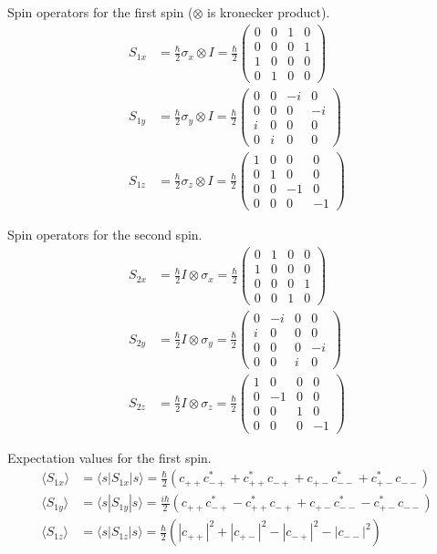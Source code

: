 Spin operators for the first spin
($\otimes$ is kronecker product).
\begin{align*}
S_{1x}&=\frac{\hbar}{2}\sigma_x\otimes I=\frac{\hbar}{2}
\begin{pmatrix}
0&0&1&0\\
0&0&0&1\\
1&0&0&0\\
0&1&0&0
\end{pmatrix}
\\
S_{1y}&=\frac{\hbar}{2}\sigma_y\otimes I=\frac{\hbar}{2}
\begin{pmatrix}
0&0&-i&0\\
0&0&0&-i\\
i&0&0&0\\
0&i&0&0
\end{pmatrix}
\\
S_{1z}&=\frac{\hbar}{2}\sigma_z\otimes I=\frac{\hbar}{2}
\begin{pmatrix}
1&0&0&0\\
0&1&0&0\\
0&0&-1&0\\
0&0&0&-1
\end{pmatrix}
\end{align*}

Spin operators for the second spin.
\begin{align*}
S_{2x}&=\frac{\hbar}{2}I\otimes\sigma_x=\frac{\hbar}{2}
\begin{pmatrix}
0&1&0&0\\
1&0&0&0\\
0&0&0&1\\
0&0&1&0
\end{pmatrix}
\\
S_{2y}&=\frac{\hbar}{2}I\otimes\sigma_y=\frac{\hbar}{2}
\begin{pmatrix}
0&-i&0&0\\
i&0&0&0\\
0&0&0&-i\\
0&0&i&0
\end{pmatrix}
\\
S_{2z}&=\frac{\hbar}{2}I\otimes\sigma_z=\frac{\hbar}{2}
\begin{pmatrix}
1&0&0&0\\
0&-1&0&0\\
0&0&1&0\\
0&0&0&-1
\end{pmatrix}
\end{align*}

Expectation values for the first spin.
\begin{align*}
\langle S_{1x}\rangle&=\langle s|S_{1x}|s\rangle
=\tfrac{\hbar}{2}
\left(c_{++}c_{-+}^*+c_{++}^*c_{-+}+c_{+-}c_{--}^*+c_{+-}^*c_{--}\right)
\\
\langle S_{1y}\rangle&=\langle s|S_{1y}|s\rangle
=\tfrac{i\hbar}{2}
\left(c_{++}c_{-+}^*-c_{++}^*c_{-+}+c_{+-}c_{--}^*-c_{+-}^*c_{--}\right)
\\
\langle S_{1z}\rangle&=\langle s|S_{1z}|s\rangle
=\tfrac{\hbar}{2}
\left(|c_{++}|^2+|c_{+-}|^2-|c_{-+}|^2-|c_{--}|^2\right)
\end{align*}

